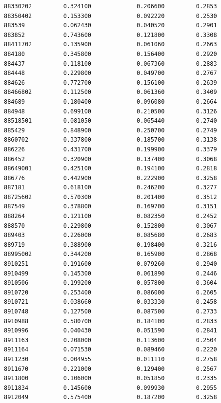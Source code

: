 \documentclass[
  letterpaper,
  DIV=11,
  numbers=noendperiod]{scrartcl}
\begin{document}
\begin{verbatim}
88330202         0.324100             0.206600         0.2853
88350402         0.153300             0.092220         0.2530
883539           0.062430             0.040520         0.2901
883852           0.743600             0.121800         0.3308
88411702         0.135900             0.061060         0.2663
884180           0.345800             0.156400         0.2920
884437           0.118100             0.067360         0.2883
884448           0.229800             0.049700         0.2767
884626           0.772700             0.156100         0.2639
88466802         0.112500             0.061360         0.3409
884689           0.180400             0.096080         0.2664
884948           0.699100             0.210500         0.3126
88518501         0.081050             0.065440         0.2740
885429           0.848900             0.250700         0.2749
8860702          0.337800             0.185700         0.3138
886226           0.431700             0.199900         0.3379
886452           0.320900             0.137400         0.3068
88649001         0.425100             0.194100         0.2818
886776           0.442900             0.222900         0.3258
887181           0.618100             0.246200         0.3277
88725602         0.570300             0.201400         0.3512
887549           0.378800             0.169700         0.3151
888264           0.121100             0.082350         0.2452
888570           0.229800             0.152800         0.3067
889403           0.226000             0.085680         0.2683
889719           0.388900             0.198400         0.3216
88995002         0.344200             0.165900         0.2868
8910251          0.191600             0.079260         0.2940
8910499          0.145300             0.061890         0.2446
8910506          0.199200             0.057800         0.3604
8910720          0.253400             0.086000         0.2605
8910721          0.038660             0.033330         0.2458
8910748          0.127500             0.087500         0.2733
8910988          0.580700             0.184100         0.2833
8910996          0.040430             0.051590         0.2841
8911163          0.208000             0.113600         0.2504
8911164          0.071530             0.089460         0.2220
8911230          0.004955             0.011110         0.2758
8911670          0.221000             0.129400         0.2567
8911800          0.106000             0.051850         0.2335
8911834          0.145600             0.099930         0.2955
8912049          0.575400             0.187200         0.3258

\end{verbatim}
\end{document}
